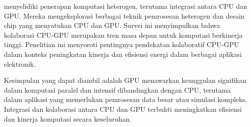 \cite{buiHeterogeneousComputingRealWorld2021} menyelidiki penerapan komputasi heterogen,
terutama integrasi antara CPU dan GPU. Mereka mengeksplorasi berbagai teknik pemrosesan
heterogen dan desain chip yang menyatukan CPU dan GPU. Survei ini menyimpulkan
bahwa kolaborasi CPU-GPU merupakan tren masa depan untuk komputasi berkinerja
tinggi. Penelitian ini menyoroti pentingnya pendekatan kolaboratif CPU-GPU dalam
konteks peningkatan kinerja dan efisiensi energi dalam berbagai aplikasi elektronik.

Kesimpulan yang dapat diambil adalah GPU menawarkan keunggulan signifikan dalam komputasi
paralel dan intensif dibandingkan dengan CPU, terutama dalam aplikasi yang
memerlukan pemrosesan data besar atau simulasi kompleks. Integrasi dan kolaborasi
antara CPU dan GPU terbukti meningkatkan efisiensi dan kinerja komputasi secara keseluruhan.





